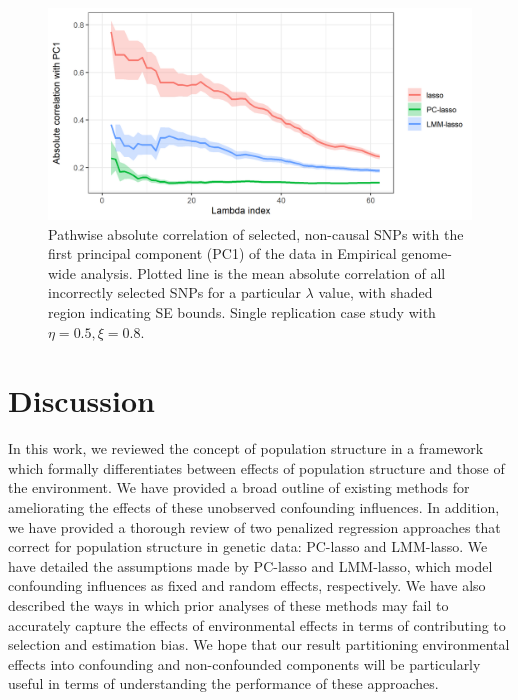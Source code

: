 \begin{figure}[H]
\centering
\includegraphics[scale = 0.9]{figures/genomewide_pc1_corr.png}
\caption{Pathwise absolute correlation of selected, non-causal SNPs with the first principal component (PC1) of the data in Empirical genome-wide analysis. Plotted line is the mean absolute correlation of all incorrectly selected SNPs for a particular $\lambda$ value, with shaded region indicating SE bounds. Single replication case study with $\eta = 0.5, \xi = 0.8$.}
\label{fig:gw_pc1_corr}
\end{figure}

\section{Discussion} \label{sec:discussion}

In this work, we reviewed the concept of population structure in a framework which formally differentiates between effects of population structure and those of the environment. We have provided a broad outline of existing  methods for ameliorating the effects of these unobserved confounding influences. In addition, we have provided a thorough review of two penalized regression approaches that correct for population structure in genetic data: PC-lasso and LMM-lasso. We have detailed the assumptions made by PC-lasso and LMM-lasso, which model confounding influences as fixed and random effects, respectively. We have also described the ways in which prior analyses of these methods may fail to accurately capture the effects of environmental effects in terms of contributing to selection and estimation bias. We hope that our result partitioning environmental effects into confounding and non-confounded components will be particularly useful in terms of understanding the performance of these approaches.

